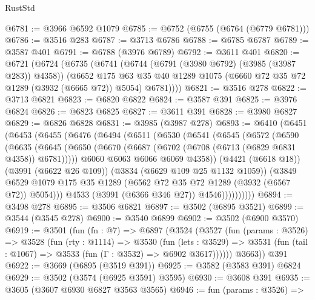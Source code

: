 \begin{lexlean}{RustStd}
\begin{coremodule}
@6781 := @3966 @6592 @1079
@6785 := @6752 (@6755 (@6764 (@6779 @6781)))
@6786 := @3516 @283
@6787 := @3713 @6786
@6788 := @6785 @6787
@6789 := @3587 @401
@6791 := @6788 (@3976 @6789)
@6792 := @3611 @401
@6820 := @6721
    (@6724
      (@6735
        (@6741
          (@6744 (@6791 (@3980 @6792) (@3985 (@3987 @283)) @4358))
          (@6652
            @175
            @63
            @35
            @40
            @1289
            @1075
            (@6660 @72 @35 @72 @1289 (@3932 (@6665 @72)) @5054)
            @6781))))
@6821 := @3516 @278
@6822 := @3713 @6821
@6823 := @6820 @6822
@6824 := @3587 @391
@6825 := @3976 @6824
@6826 := @6823 @6825
@6827 := @3611 @391
@6828 := @3980 @6827
@6829 := @6826 @6828
@6831 := @3985 (@3987 @278)
@6893 := @6410
    (@6451
      (@6453
        (@6455
          (@6476
            (@6494
              (@6511
                (@6530
                  (@6541
                    (@6545
                      (@6572
                        (@6590
                          (@6635
                            (@6645
                              (@6650
                                (@6670 (@6687 (@6702 (@6708 (@6713 (@6829 @6831 @4358)) @6781)))))
                              @6060
                              @6063
                              @6066
                              @6069
                              @4358))
                          (@4421 (@6618 @18))
                          (@3991 (@6622 @26 @109))
                          (@3834 (@6629 @109 @25 @1132 @1059))
                          (@3849
                            @6529
                            @1079
                            @175
                            @35
                            @1289
                            (@6562 @72 @35 @72 @1289 (@3932 (@6567 @72)) @5054)))
                        @4533
                        (@3991 (@6366 @346 @27))
                        @4546))))))))))
@6894 := @3498 @278
@6895 := @3506 @6821
@6897 := @3502 (@6895 @3521)
@6899 := @3544 (@3545 @278)
@6900 := @3540 @6899
@6902 := @3502 (@6900 @3570)
@6919 := @3501
    (fun (fn : @7) =>
    @6897
      (@3524
        (@3527
          (fun (params : @3526) =>
          @3528
            (fun (rty : @1114) =>
            @3530
              (fun (lets : @3529) =>
              @3531 (fun (tail : @1067) => @3533 (fun (Γ : @3532) => @6902 @3617))))))
        @3663))
    @391
@6922 := @3669 (@6895 (@3519 @391))
@6925 := @3582 (@3583 @391) @6824
@6929 := @3502 (@3574 (@6925 @3591) @3595)
@6930 := @3608 @391
@6935 := @3605 (@3607 @6930 @6827 @3563 @3565)
@6946 := fun (params : @3526) =>

\end{coremodule}
\end{lexlean}

